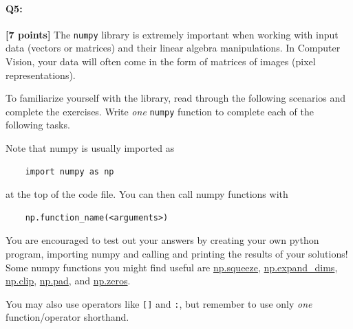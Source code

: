 \documentclass[11pt]{article}
\begin{document}
\begin{enumerate}[(a)]
    
\end{enumerate}

\pagebreak
\paragraph{Q5:} \textbf{[7 points]} The \texttt{numpy} library is extremely important when working with input data (vectors or matrices) and their linear algebra manipulations. In Computer Vision, your data will often come in the form of matrices of images (pixel representations). 

 To familiarize yourself with the library, read through the following scenarios and complete the exercises. Write \emph{one} \texttt{numpy} function to complete each of the following tasks.

Note that numpy is usually imported as
\begin{verbatim}
    import numpy as np
\end{verbatim}
at the top of the code file. You can then call numpy functions with \begin{verbatim}
    np.function_name(<arguments>)
\end{verbatim}
You are encouraged to test out your answers by creating your own python program, importing numpy and calling and printing the results of your solutions! Some numpy functions you might find useful are \href{https://numpy.org/doc/stable/reference/generated/numpy.squeeze.html}{np.squeeze}, \href{https://numpy.org/doc/stable/reference/generated/numpy.expand_dims.html}{np.expand\_dims}, \href{https://numpy.org/doc/stable/reference/generated/numpy.clip.html}{np.clip}, \href{https://numpy.org/doc/stable/reference/generated/numpy.pad.html}{np.pad}, and \href{https://numpy.org/doc/stable/reference/generated/numpy.zeros.html}{np.zeros}.

You may also use operators like \texttt{[]} and \texttt{:}, but remember to use only \textit{one} function/operator shorthand.
\end{document}
